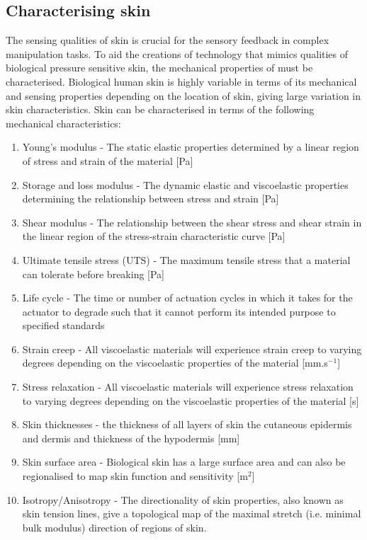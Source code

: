 \subsection{Characterising skin}
The sensing qualities of skin is crucial for the sensory feedback in complex manipulation tasks. To aid the creations of technology that mimics qualities of biological pressure sensitive skin, the mechanical properties of must be characterised. Biological human skin is highly variable in terms of its mechanical and sensing properties depending on the location of skin, giving large variation in skin characteristics. Skin can be characterised in terms of the following mechanical characteristics:
\begin{enumerate}
    \item Young's modulus -  The static elastic properties determined by a linear region of stress and strain of the material [Pa]
    \item Storage and loss modulus - The dynamic elastic and viscoelastic properties determining the relationship between stress and strain [Pa]
    \item Shear modulus - The relationship between the shear stress and shear strain in the linear region of the stress-strain characteristic curve [Pa]
    \item Ultimate tensile stress (UTS) - The maximum tensile stress that a material can tolerate before breaking [Pa]
    \item Life cycle - The time or number of actuation cycles in which it takes for the actuator to degrade such that it cannot perform its intended purpose to specified standards
    \item Strain creep - All viscoelastic materials will experience strain creep to varying degrees depending on the viscoelastic properties of the material [mm.s$^{-1}$]
    \item Stress relaxation - All viscoelastic materials will experience stress relaxation to varying degrees depending on the viscoelastic properties of the material [s]
    \item Skin thicknesses - the thickness of all layers of skin the cutaneous epidermis and dermis and thickness of the hypodermis [mm]
    \item Skin surface area - Biological skin has a large surface area and can also be regionalised to map skin function and sensitivity [m$^2$]
    \item Isotropy/Anisotropy - The directionality of skin properties, also known as skin tension lines, give a topological map of the maximal stretch (i.e. minimal bulk modulus) direction of regions of skin.
\end{enumerate}
